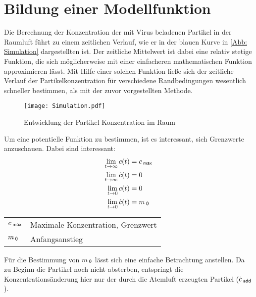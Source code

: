 \documentclass[12pt,a4paper,bibtotocnumbered,liststotocnumbered]{scrreprt}
\begin{document}
\section{Bildung einer Modellfunktion}
Die Berechnung der Konzentration der mit Virus beladenen Partikel in der Raumluft führt zu einem zeitlichen Verlauf, wie er in der blauen Kurve in \autoref{Abb: Simulation} dargestellten ist. Der zeitliche Mittelwert ist dabei eine relativ stetige Funktion, die sich möglicherweise mit einer einfacheren mathematischen Funktion approximieren lässt. Mit Hilfe einer solchen Funktion ließe sich der zeitliche Verlauf der Partikelkonzentration für verschiedene Randbedingungen wesentlich schneller bestimmen, als mit der zuvor vorgestellten Methode.
\begin{figure}[H]
\begin{center}
\texttt{[image: Simulation.pdf]}
\caption{Entwicklung der Partikel-Konzentration im Raum}
\label{Abb: Simulation}
\end{center}
\end{figure}

Um eine potentielle Funktion zu bestimmen, ist es interessant, sich Grenzwerte anzuschauen. Dabei sind interessant:
\begin{align}
\label{Equ.: c_max}
\lim \limits_{t \to \infty} c(t) & = c_{\: \mathsf{max}}\\
\label{Equ.: c_inf_abl}
\lim \limits_{t \to \infty} \dot{c}(t) & = 0\\
\lim \limits_{t \to 0} c(t) & = 0\\
\label{Equ.: m_0}
\lim \limits_{t \to 0} \dot{c}(t) & = m_{\: \mathsf{0}}
\end{align}

\begin{tabular}{ll}
$c_{\: \mathsf{max}} $ & Maximale Konzentration, Grenzwert\\
$m_{\: \mathsf{0}}$ & Anfangsanstieg\\
\end{tabular}

Für die Bestimmung von $m_{\: \mathsf{0}}$ lässt sich eine einfache Betrachtung anstellen. Da zu Beginn die Partikel noch nicht absterben, entspringt die Konzentrationsänderung hier nur der durch die Atemluft erzeugten Partikel ($\dot{c}_{\: \mathsf{add}}$).\\
\end{document}
